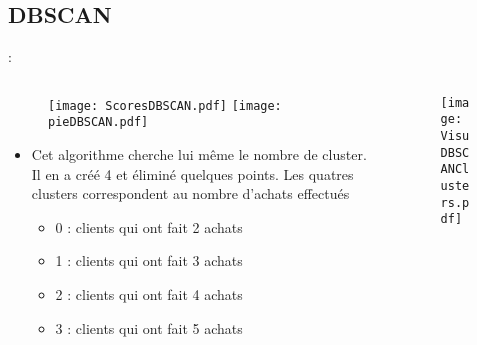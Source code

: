 \documentclass[8pt,aspectratio=169,hyperref={unicode=true}]{beamer}
\begin{document}
\subsection{DBSCAN}
\begin{frame}{\insertsection: \insertsubsection}
    \begin{columns}
        \begin{column}{.55\textwidth}
            \begin{figure}
                \texttt{[image: ScoresDBSCAN.pdf]}
                \texttt{[image: pieDBSCAN.pdf]}
            \end{figure}
            \begin{itemize}
                \item Cet algorithme cherche lui même le nombre de cluster. Il en a créé 4 et éliminé quelques points. Les quatres clusters correspondent au nombre d'achats effectués
                      \begin{itemize}
                          \item 0 : clients qui ont fait 2 achats
                          \item 1 : clients qui ont fait 3 achats
                          \item 2 : clients qui ont fait 4 achats
                          \item 3 : clients qui ont fait 5 achats
                      \end{itemize}
            \end{itemize}
        \end{column}
        \begin{column}{.45\textwidth}
            \begin{figure}
                \texttt{[image: VisuDBSCANClusters.pdf]}
            \end{figure}
        \end{column}
    \end{columns}
\end{frame}
\end{document}
